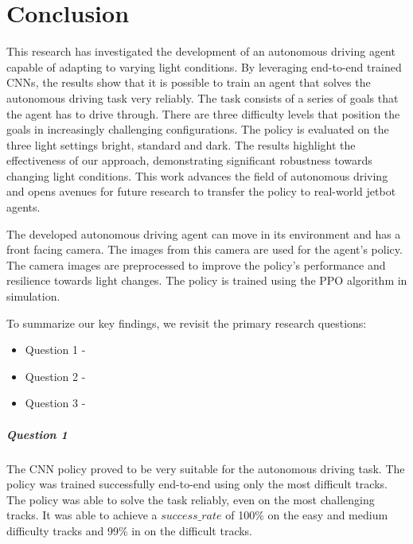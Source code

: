\chapter{Conclusion}
\label{cha:Conclusion}
\acresetall


This research has investigated the development of an autonomous driving agent capable of adapting to varying light conditions. By leveraging end-to-end trained \acl{CNN}s, the results show that it is possible to train an agent that solves the autonomous driving task very reliably. The task consists of a series of goals that the agent has to drive through. There are three difficulty levels that position the goals in increasingly challenging configurations. The policy is evaluated on the three light settings bright, standard and dark.
The results highlight the effectiveness of our approach, demonstrating significant robustness towards changing light conditions. This work advances the field of autonomous driving and opens avenues for future research to transfer the policy to real-world jetbot agents.

The developed autonomous driving agent can move in its environment and has a front facing camera. The images from this camera are used for the agent's policy. The camera images are preprocessed to improve the policy's performance and resilience towards light changes. The policy is trained using the \ac{PPO} algorithm in simulation.

To summarize our key findings, we revisit the primary research questions:
\begin{itemize}
    \item Question 1 - \questionOne
    \item Question 2 - \questionTwo
    \item Question 3 - \questionThree
\end{itemize}

\paragraph{Question 1}
The \ac{CNN} policy proved to be very suitable for the autonomous driving task. The policy was trained successfully end-to-end using only the most difficult tracks. The policy was able to solve the task reliably, even on the most challenging tracks. It was able to achieve a $success\_rate$ of 100\% on the easy and medium difficulty tracks and 99\% in on the difficult tracks.

